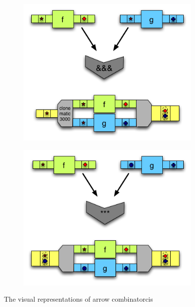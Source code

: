 \begin{figure}
\begin{subfigure}[b]{0.475\textwidth}
      \centering 
      \includegraphics[width=\textwidth]{background/image/ArrowsConveyors_ampersand2.png}
      \label{fig:mean and std of net34}
  \end{subfigure}
  \quad
  \begin{subfigure}[b]{0.475\textwidth}   
      \centering 
      \includegraphics[width=\textwidth]{background/image/ArrowsConveyors_star2.png}
      \label{fig:mean and std of net44}
  \end{subfigure}
  \caption
  {\small The visual representations of arrow combinatorcis}
  \label{b:ar:p1}
\end{figure}
